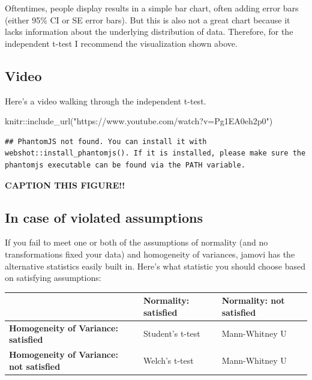 \documentclass[
]{book}
\newenvironment{Shaded}{\begin{snugshade}}{\end{snugshade}}
\newcommand{\FunctionTok}[1]{\textcolor[rgb]{0.00,0.00,0.00}{#1}}
\newcommand{\NormalTok}[1]{#1}
\newcommand{\SpecialCharTok}[1]{\textcolor[rgb]{0.00,0.00,0.00}{#1}}
\newcommand{\StringTok}[1]{\textcolor[rgb]{0.31,0.60,0.02}{#1}}
\begin{document}
Oftentimes, people display results in a simple bar chart, often adding error bars (either 95\% CI or SE error bars). But this is also not a great chart because it lacks information about the underlying distribution of data. Therefore, for the independent t-test I recommend the visualization shown above.

\hypertarget{video-2}{%
\subsection{Video}\label{video-2}}

Here's a video walking through the independent t-test.

\begin{Shaded}
\begin{Highlighting}[]
\NormalTok{knitr}\SpecialCharTok{::}\FunctionTok{include\_url}\NormalTok{(}\StringTok{"https://www.youtube.com/watch?v=Pg1EA0eh2p0"}\NormalTok{)}
\end{Highlighting}
\end{Shaded}

\begin{verbatim}
## PhantomJS not found. You can install it with webshot::install_phantomjs(). If it is installed, please make sure the phantomjs executable can be found via the PATH variable.
\end{verbatim}

\label{fig:unnamed-chunk-1}\textbf{CAPTION THIS FIGURE!!}

\hypertarget{in-case-of-violated-assumptions-1}{%
\subsection{In case of violated assumptions}\label{in-case-of-violated-assumptions-1}}

If you fail to meet one or both of the assumptions of normality (and no transformations fixed your data) and homogeneity of variances, jamovi has the alternative statistics easily built in. Here's what statistic you should choose based on satisfying assumptions:

\begin{longtable}[]{@{}lll@{}}
\toprule
& \textbf{Normality: satisfied} & \textbf{Normality: not satisfied} \\
\midrule
\endhead
\textbf{Homogeneity of Variance: satisfied} & Student's t-test & Mann-Whitney U \\
\textbf{Homogeneity of Variance: not satisfied} & Welch's t-test & Mann-Whitney U \\
\bottomrule
\end{longtable}
\end{document}
